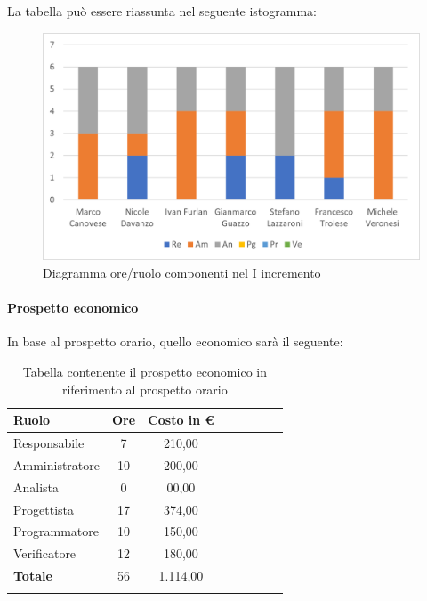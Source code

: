 La tabella può essere riassunta nel seguente istogramma:

\begin{figure}[H]
	\centering
	\includegraphics[width=0.8\linewidth]{res/images/preventivo/dettaglio_analisi/1-1.png}
	\caption{Diagramma ore/ruolo componenti nel I incremento}
	\label{fig:diagramma suddivisione ruoli I incremento}
\end{figure}

\paragraph{Prospetto economico}
In base al prospetto orario, quello economico sarà il seguente:

\begin{longtable}{|l|c|c|c|c|c|c|c|}
	\hline
	\rowcolor{lighter-grayer}
	\textbf{Ruolo}  & \textbf{Ore} & \textbf{Costo in €} \\
	\hline
	\endfirsthead

	\hline
	Responsabile    & 7            & 210,00              \\
	\hline
	\hline
	Amministratore  & 10           & 200,00              \\
	\hline
	\hline
	Analista        & 0           & 00,00              \\
	\hline
	\hline
	Progettista     & 17            & 374,00                   \\
	\hline
	\hline
	Programmatore   & 10            & 150,00                   \\
	\hline
	\hline
	Verificatore    & 12            & 180,00                   \\
	\hline
	\textbf{Totale} & 56           & 1.114,00            \\
	\hline
	\rowcolor{white}
	\caption{Tabella contenente il prospetto economico in riferimento al prospetto orario}
\end{longtable}
\pagebreak


